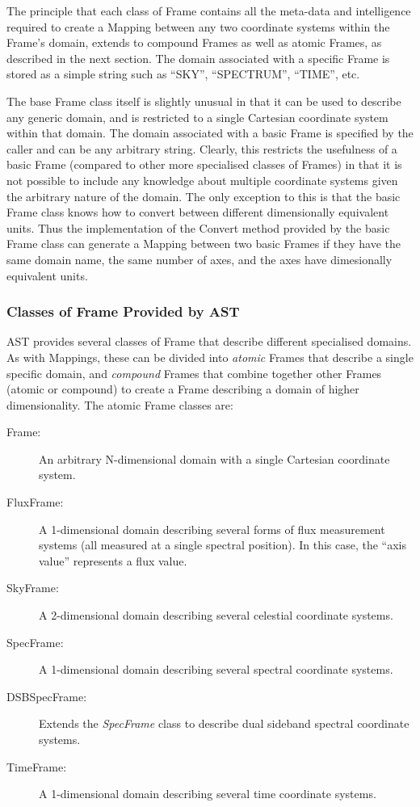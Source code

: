 \documentclass[final,authoryear,5p,times,twocolumn]{elsarticle}
\begin{document}
The principle that each class of Frame contains all the meta-data and
intelligence required to create a Mapping between any two coordinate
systems within the Frame's domain, extends to compound Frames as well as
atomic Frames, as described in the next section. The domain associated
with a specific Frame is stored as a simple string such as ``SKY'',
``SPECTRUM'', ``TIME'', etc.

The base Frame class itself is slightly unusual in that it can be used to
describe any generic domain, and is restricted to a single Cartesian
coordinate system within that domain. The domain associated with a basic
Frame is specified by the caller and can be any arbitrary string. Clearly,
this restricts the usefulness of a basic Frame (compared to other more
specialised classes of Frames) in that it is not possible to include any
knowledge about multiple coordinate systems given the arbitrary nature of
the domain. The only exception to this is that the basic Frame class
knows how to convert between different dimensionally equivalent units.
Thus the implementation of the Convert method provided by the basic Frame
class can generate a Mapping between two basic Frames if they have the
same domain name, the same number of axes, and the axes have dimesionally
equivalent units.

\subsubsection{Classes of Frame Provided by AST}
AST provides several classes of Frame that describe different specialised
domains. As with Mappings, these can be divided into \emph{atomic} Frames that
describe a single specific domain, and \emph{compound} Frames that combine
together other Frames (atomic or compound) to create a Frame describing a
domain of higher dimensionality. The atomic Frame classes are:

\begin{description}
\item[Frame:] An arbitrary N-dimensional domain with a single Cartesian
coordinate system.
\item[FluxFrame:] A 1-dimensional domain describing several forms of flux
measurement systems (all measured at a single spectral position). In this
case, the ``axis value'' represents a flux value.
\item[SkyFrame:] A 2-dimensional domain describing several celestial
coordinate systems.
\item[SpecFrame:] A 1-dimensional domain describing several spectral
coordinate systems.
\item[DSBSpecFrame:] Extends the \emph{SpecFrame} class to describe dual
sideband spectral coordinate systems.
\item[TimeFrame:] A 1-dimensional domain describing several time coordinate
systems.
\end{description}
\end{document}
